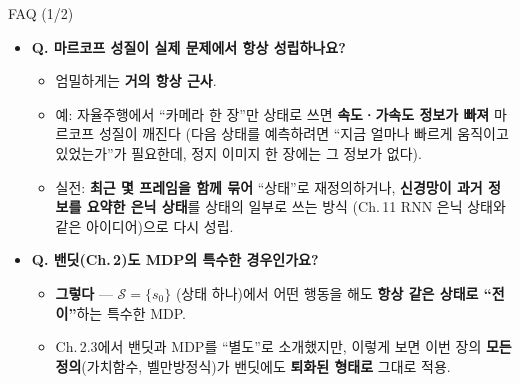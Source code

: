 \documentclass[aspectratio=169,11pt]{beamer}
\begin{document}
\begin{frame}{FAQ (1/2)}
  \begin{itemize}
    \item \textbf{Q. 마르코프 성질이 실제 문제에서 항상
      성립하나요?}
      \begin{itemize}
        \item 엄밀하게는 \textbf{거의 항상 근사}.
        \item 예: 자율주행에서 ``카메라 한 장''만 상태로 쓰면
          \textbf{속도·가속도 정보가 빠져} 마르코프 성질이 깨진다
          (다음 상태를 예측하려면 ``지금 얼마나 빠르게
          움직이고 있었는가''가 필요한데, 정지 이미지 한 장에는
          그 정보가 없다).
        \item 실전: \textbf{최근 몇 프레임을 함께 묶어}
          ``상태''로 재정의하거나, \textbf{신경망이 과거 정보를
          요약한 은닉 상태}를 상태의 일부로 쓰는 방식
          (Ch.\,11 RNN 은닉 상태와 같은 아이디어)으로 다시 성립.
      \end{itemize}
    \item \textbf{Q. 밴딧(Ch.\,2)도 MDP의 특수한 경우인가요?}
      \begin{itemize}
        \item \textbf{그렇다} --- $\mathcal{S} = \{s_0\}$ (상태
          하나)에서 어떤 행동을 해도 \textbf{항상 같은 상태로
          ``전이''}하는 특수한 MDP.
        \item Ch.\,2.3에서 밴딧과 MDP를 ``별도''로 소개했지만,
          이렇게 보면 이번 장의 \textbf{모든 정의}(가치함수,
          벨만방정식)가 밴딧에도 \textbf{퇴화된 형태로} 그대로
          적용.
      \end{itemize}
  \end{itemize}
\end{frame}
\end{document}
